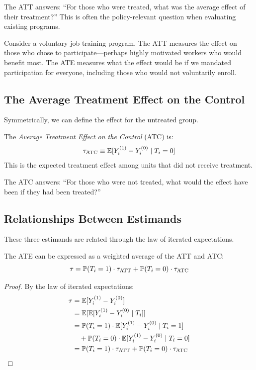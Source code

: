 The ATT answers: ``For those who were treated, what was the average effect of their treatment?'' This is often the policy-relevant question when evaluating existing programs.

\begin{example}
Consider a voluntary job training program. The ATT measures the effect on those who chose to participate---perhaps highly motivated workers who would benefit most. The ATE measures what the effect would be if we mandated participation for everyone, including those who would not voluntarily enroll.
\end{example}

\subsection{The Average Treatment Effect on the Control}

Symmetrically, we can define the effect for the untreated group.

\begin{definition}
\label{def:atc}
The \emph{Average Treatment Effect on the Control} (ATC) is:
\begin{equation}
\tau_{\text{ATC}} \equiv \mathbb{E}[Y^{(1)}_i - Y^{(0)}_i \mid T_i = 0]
\label{eq:atc}
\end{equation}
This is the expected treatment effect among units that did not receive treatment.
\end{definition}

The ATC answers: ``For those who were not treated, what would the effect have been if they had been treated?''

\subsection{Relationships Between Estimands}

These three estimands are related through the law of iterated expectations.

\begin{proposition}
\label{prop:ate_decomposition}
The ATE can be expressed as a weighted average of the ATT and ATC:
\begin{equation}
\tau = \mathbb{P}(T_i = 1) \cdot \tau_{\text{ATT}} + \mathbb{P}(T_i = 0) \cdot \tau_{\text{ATC}}
\label{eq:ate_weights}
\end{equation}
\end{proposition}

\begin{proof}
By the law of iterated expectations:
\begin{align*}
\tau &= \mathbb{E}[Y^{(1)}_i - Y^{(0)}_i] \\
&= \mathbb{E}[\mathbb{E}[Y^{(1)}_i - Y^{(0)}_i \mid T_i]] \\
&= \mathbb{P}(T_i = 1) \cdot \mathbb{E}[Y^{(1)}_i - Y^{(0)}_i \mid T_i = 1] \\
&\quad + \mathbb{P}(T_i = 0) \cdot \mathbb{E}[Y^{(1)}_i - Y^{(0)}_i \mid T_i = 0] \\
&= \mathbb{P}(T_i = 1) \cdot \tau_{\text{ATT}} + \mathbb{P}(T_i = 0) \cdot \tau_{\text{ATC}}
\end{align*}
\end{proof}

